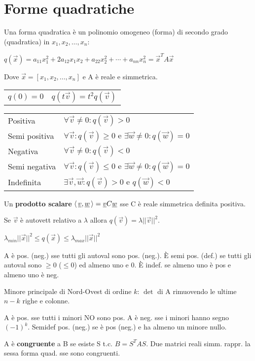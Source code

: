\section{Forme quadratiche}

Una forma quadratica è un polinomio omogeneo (forma) di secondo grado (quadratica) in $x_1, x_2, \dots, x_n$:

$q(\vec{x}) = a_{11}x_1^2+2a_{12}x_1x_2+a_{22}x_2^2+\cdots+a_{nn}x_n^2 = \vec{x}^TA\vec{x}$

Dove $\vec{x} = [x_1, x_2, \dots, x_n]$ e A è reale e simmetrica.

\begin{tabular}{ll}
	$q(0)=0$ & $q(t\vec{v}) = t^2q(\vec{v})$
\end{tabular}

\begin{tabular}{ll}
	Positiva & $\forall \vec{v} \ne 0: q(\vec{v}) > 0$ \\
	Semi positiva & $\forall \vec{v}: q(\vec{v}) \ge 0$ e $\exists \vec{w} \ne 0 : q(\vec{w}) = 0$ \\
	Negativa & $\forall \vec{v} \ne 0: q(\vec{v}) < 0$ \\
	Semi negativa & $\forall \vec{v}: q(\vec{v}) \le 0$ e $\exists \vec{w} \ne 0 : q(\vec{w}) = 0$ \\
	Indefinita & $\exists \vec{v}, \vec{w}: q(\vec{v}) > 0$ e $q(\vec{w}) < 0$
\end{tabular}

Un \textbf{prodotto scalare} $\langle\,\underline{v},\underline{w}\,\rangle = \underline{v}C\underline{w}$ sse C è reale simmetrica definita positiva.

Se $\vec{v}$ è autovett relativo a $\lambda$ allora $q(\vec{v}) = \lambda||\vec{v}||^2$.

$\lambda_{min}||\vec{x}||^2 \le q(\vec{x}) \le \lambda_{max}||\vec{x}||^2$

A è pos. (neg.) sse tutti gli autoval sono pos. (neg.). È semi pos. (def.) se tutti gli autoval sono $\ge 0$ ($\le 0$) ed almeno uno e 0. È indef. se almeno uno è pos e almeno uno è neg.

Minore principale di Nord-Ovest di ordine $k$: $\det$ di A rimuovendo le ultime $n-k$ righe e colonne.

A è pos. sse tutti i minori NO sono pos. A è neg. sse i minori hanno segno $(-1)^k$. Semidef pos. (neg.) se è pos (neg.) e ha almeno un minore nullo.

A è \textbf{congruente} a B se esiste S t.c. $B=S^TAS$. Due matrici reali simm. rappr. la sessa forma quad. sse sono congruenti.

